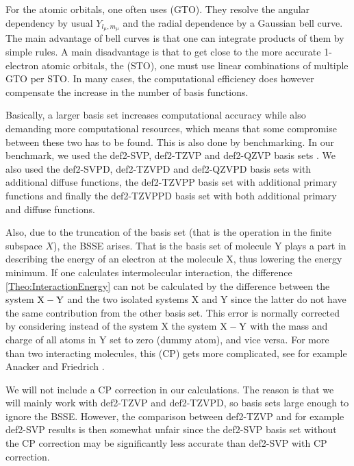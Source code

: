 \documentclass[8.5pt,twoside,twocolumn]{article}
\renewcommand\r{\bo r}
\theoremstyle{standard}
\begin{document}
For the atomic orbitals, one often uses  (GTO). They resolve the
angular dependency by usual  $Y_{l_\mu,m_\mu}$ and the radial dependence
by a Gaussian bell curve. The main advantage of bell curves is that one can integrate products
of them by simple rules. A main disadvantage
is that to get close to the more accurate 1-electron atomic orbitals, the 
(STO), one must use linear combinations of multiple GTO per STO. In many cases, the computational
efficiency does however compensate the increase in the number of basis functions.

Basically, a larger basis set increases computational accuracy while also demanding more
computational resources, which means that some compromise between these two has to
be found. This is also done by benchmarking. In our benchmark, we used the
def2-SVP, def2-TZVP and def2-QZVP basis sets \cite{def2Basis}. We also used the
def2-SVPD, def2-TZVPD and def2-QZVPD basis sets with additional diffuse functions,
the def2-TZVPP basis set with additional primary functions and finally the 
def2-TZVPPD basis set with both additional primary and diffuse functions.

Also, due to the truncation of the basis set (that is the operation in the finite subspace $X$),
the  BSSE arises. That is the basis set of molecule Y plays a
part in describing the energy of an electron at the molecule X, thus lowering the energy minimum.
If one calculates intermolecular interaction, the difference \eqref{Theo:InteractionEnergy} 
can not be calculated by the difference between the system ${\text X - \text Y}$ and the two isolated systems
X and Y since the latter do not have the same contribution from the other basis set.
This error is normally corrected by considering instead of the system X the system ${\text X - \text Y}$
with the mass and charge of all atoms in Y set to zero (dummy atom), and vice versa.
For more than two interacting molecules, this  (CP) gets
more complicated, see for example Anacker and Friedrich \cite{Anacker2014}.

We will
not include a CP correction in our calculations. The reason is that we will mainly
work with def2-TZVP and def2-TZVPD, so basis sets large enough to ignore the 
BSSE. However, the comparison between def2-TZVP and for example def2-SVP results
is then somewhat unfair since the def2-SVP basis set without the CP correction
may be significantly less accurate than def2-SVP with CP correction.   
\end{document}
